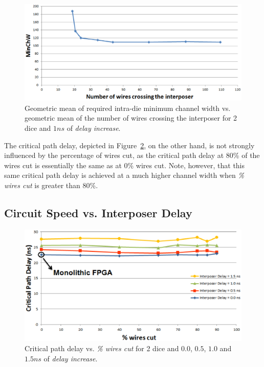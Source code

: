 \documentclass[journal]{IEEEtran}
\begin{document}
\begin{figure}[!t]
\centering
\includegraphics[width=\linewidth]{numberofcrossingwires_new.eps}
\caption{Geometric mean of required intra-die minimum channel width vs. geometric mean of the number of wires crossing the interposer for 2 dice and $1ns$ of \textit{delay increase}.}
\label{fig:crossingwires}
\end{figure}

The critical path delay, depicted in Figure~\ref{fig:delays_crit}, on the other hand, is not strongly influenced by the percentage of wires cut, as the critical path delay at 80\% of the wires cut is essentially the same as at 0\% wires cut. Note, however, that this same critical path delay is achieved at a much higher channel width when \textit{\% wires cut} is greater than 80\%.

\subsection{Circuit Speed vs. Interposer Delay}

\begin{figure}[!b]
\centering
\includegraphics[width=\linewidth]{delays_crit_path_new.eps}
\caption{Critical path delay vs. \textit{\% wires cut} for 2 dice and $0.0$, $0.5$, $1.0$ and $1.5ns$ of \textit{delay increase}.}
\label{fig:delays_crit}
\end{figure}
\end{document}
